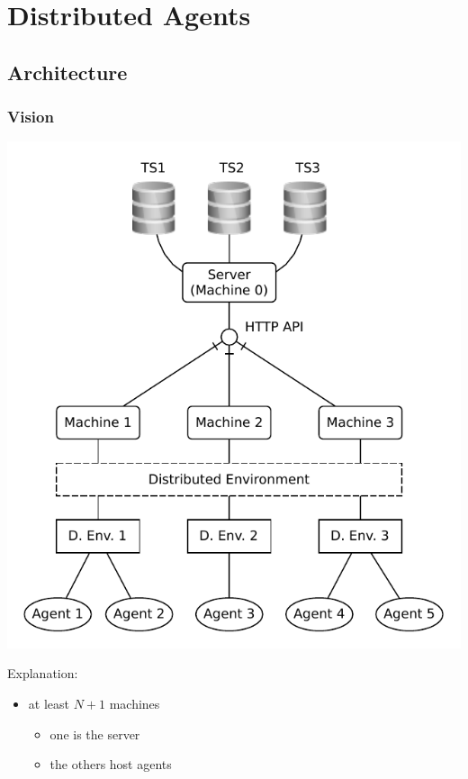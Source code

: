 \documentclass[presentation]{beamer}\mode<presentation>{\usetheme{AMSCesenaPurpleAndGold}}
\begin{document}
\section{Distributed Agents}

\subsection{Architecture}

\begin{frame}[allowframebreaks]
	\frametitle{Vision}

	\begin{center}
		\includegraphics[height=0.8\textheight]{./img/overview.pdf}
	\end{center}

	\framebreak

	Explanation:
	\medskip
	\begin{itemize}
		\item at least $N + 1$ machines
		\begin{itemize}
			\item one is the \linda{} server
			\item the others host agents
		\end{itemize}
		

\end{itemize}
\end{frame}
\end{document}
